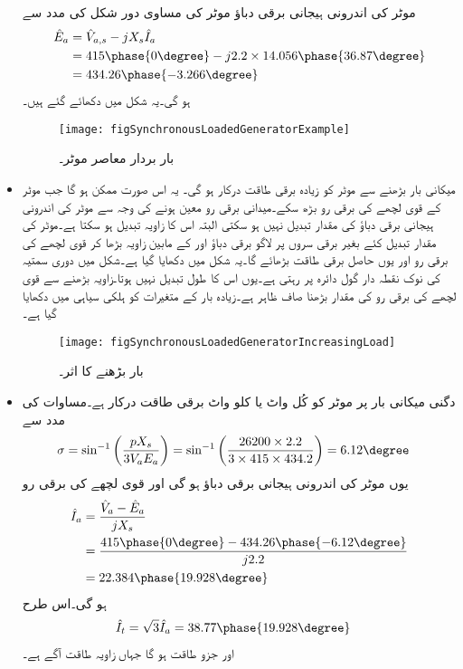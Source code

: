 \begin{itemize}
موٹر کی اندرونی ہیجانی برقی دباؤ موٹر کی مساوی دور شکل   کی مدد سے
\begin{align*}
\hat{E}_a&=\hat{V}_{a,s}- j X_s \hat{I}_a\\
&=415 \phase{0\degree}-j 2.2 \times 14.056 \phase{36.87\degree}\\
&=434.26 \phase{-3.266\degree}
\end{align*}
ہو گی۔یہ شکل   میں دکھائے گئے ہیں۔
\begin{figure}
\centering
\texttt{[image: figSynchronousLoadedGeneratorExample]}
\caption{بار بردار معاصر موٹر۔}
\label{شکل_معاصر_بار_بردار_جنریٹر_مثال}
\end{figure}
%
\item
میکانی بار بڑھنے سے موٹر کو زیادہ برقی طاقت درکار ہو گی۔ یہ اس صورت ممکن ہو گا جب موٹر کے قوی لچھے کی برقی رو بڑھ سکے۔میدانی برقی رو معین ہونے کی وجہ سے موٹر کی اندرونی ہیجانی برقی دباؤ  کی مقدار تبدیل نہیں ہو سکتی البتہ اس کا زاویہ تبدیل ہو سکتا ہے۔موٹر    کی مقدار تبدیل کئے بغیر  برقی سروں پر لاگو برقی دباؤ    اور   کے مابین زاویہ بڑھا کر قوی لچھے کی برقی رو اور یوں حاصل برقی طاقت بڑھائے گا۔یہ شکل   میں دکھایا گیا ہے۔شکل میں  دوری سمتیہ کی نوک نقطہ دار گول دائرہ پر رہتی ہے۔یوں اس کا طول تبدیل نہیں ہوتا۔زاویہ بڑھنے سے قوی لچھے کی برقی رو کی مقدار بڑھنا صاف ظاہر ہے۔زیادہ بار کے متغیرات کو ہلکی سیاہی میں دکھایا گیا ہے۔
\begin{figure}
\centering
\texttt{[image: figSynchronousLoadedGeneratorIncreasingLoad]}
\caption{بار بڑھنے کا اثر۔}
\label{شکل_معاصر_بار_بڑھانے_کا_اثر}
\end{figure}
%
\item
دگنی میکانی بار پر موٹر کو کُل   واٹ یا   کلو واٹ برقی طاقت درکار ہے۔مساوات  کی مدد سے
\begin{align*}
\sigma&=\sin^{-1} \left(\frac{p X_s}{3 V_a E_a} \right)=\sin^{-1} \left(\frac{26200 \times 2.2}{3\times 415 \times 434.2} \right)=6.12\degree
\end{align*}
یوں موٹر کی اندرونی ہیجانی برقی دباؤ  ہو گی اور قوی لچھے کی برقی رو
\begin{align*}
\hat{I}_a&=\frac{\hat{V}_a-\hat{E}_a}{j X_s}\\
&=\frac{415\phase{0\degree}-434.26\phase{-6.12\degree}}{j 2.2}\\
&=22.384\phase{19.928\degree}
\end{align*}
ہو گی۔اس طرح 
\begin{align*}
\hat{I}_t&=\sqrt{3} \hat{I}_a=38.77\phase{19.928\degree}
\end{align*}
اور جزو طاقت  ہو گا جہاں زاویہ طاقت آگے ہے۔
\end{itemize}

